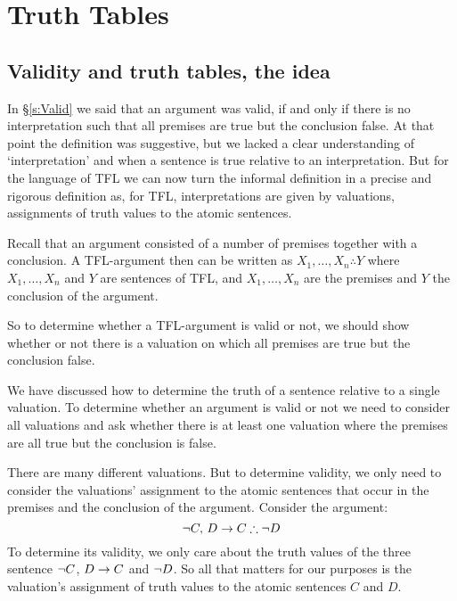 \chapter{Truth Tables}
\section{Validity and truth tables, the idea}\label{sec:valtt}
In \S\ref{s:Valid} we said that an argument was valid, if and only if there is no interpretation such that all premises are true but the conclusion false. At that point the definition was suggestive, but we lacked a clear understanding of `interpretation' and when a sentence is true relative to an interpretation. But for the language of TFL we can now turn the informal definition in a precise and rigorous definition as, for TFL, interpretations are given by valuations, assignments of truth values to the atomic sentences. 

Recall that an argument consisted of a number of premises together with a conclusion. A TFL-argument then can be written as $X_1,\ldots,X_n\therefore Y$ where $X_1,\ldots,X_n$ and $Y$ are sentences of TFL, and $X_1,\ldots,X_n$ are the premises and $Y$ the conclusion of the argument.


So to determine whether a TFL-argument is valid or not, we should show whether or not there is a valuation on which all premises are true but the conclusion false. 

We have discussed how to determine the truth of a sentence relative to a single valuation. To determine whether an argument is valid or not we need to consider all valuations and ask whether there is at least one valuation where the premises are all true but the conclusion is false. 

There are many different valuations. But to determine validity, we only need to consider the valuations' assignment to the atomic sentences that occur in the premises and the conclusion of the argument. Consider the argument:
$$\enot C,\,D\eif C\therefore\enot  D$$
To determine its validity, we only care about the truth values of the three sentence $\neg C$, $D\rightarrow C$ and $\neg D$. So all that matters for our purposes is the valuation's assignment of truth values to the atomic sentences $C$ and $D$.

